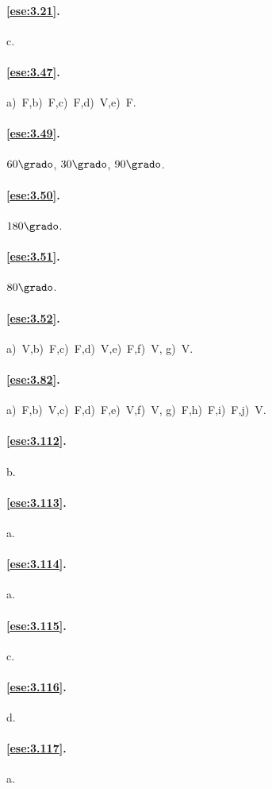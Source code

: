 \paragraph{\ref{ese:3.21}.}
c.

\paragraph{\ref{ese:3.47}.}
a)~F,\quad b)~F,\quad c)~F,\quad d)~V,\quad e)~F.

\paragraph{\ref{ese:3.49}.}
$60\grado$, $30\grado$, $90\grado$.

\paragraph{\ref{ese:3.50}.}
$180\grado$.

\paragraph{\ref{ese:3.51}.}
$80\grado$.

\paragraph{\ref{ese:3.52}.}
a)~V,\quad b)~F,\quad c)~F,\quad d)~V,\quad e)~F,\quad f)~V,\quad 
g)~V.

\paragraph{\ref{ese:3.82}.}
a)~F,\quad b)~V,\quad c)~F,\quad d)~F,\quad e)~V,\quad f)~V,\quad 
g)~F,\quad h)~F,\quad i)~F,\quad j)~V.

\paragraph{\ref{ese:3.112}.}
b.

\paragraph{\ref{ese:3.113}.}
a.

\paragraph{\ref{ese:3.114}.}
a.

\paragraph{\ref{ese:3.115}.}
c.

\paragraph{\ref{ese:3.116}.}
d.

\paragraph{\ref{ese:3.117}.}
a.

\endgroup
